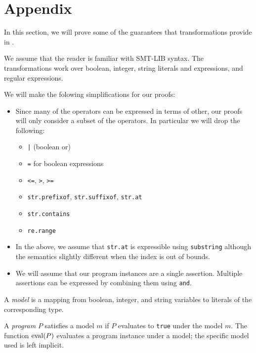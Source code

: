 \section{Appendix}

In this section, we will prove some of the guarantees that transformations
provide in \fuzzer{}.

We assume that the reader is familiar with SMT-LIB syntax. The transformations
work over boolean, integer, string literals and expressions, and regular
expressions.

We will make the folowing simplifications for our proofs:
\begin{itemize}
  \item
    Since many of the operators can be expressed in terms of other, our
    proofs will only consider a subset of the operators. In particular we will
    drop the following:
    \begin{itemize}
      \item \texttt{|} (boolean or)
      \item \texttt{=} for boolean expressions
      \item \texttt{<=}, \texttt{>}, \texttt{>=}
      \item \texttt{str.prefixof}, \texttt{str.suffixof}, \texttt{str.at}
      \item \texttt{str.contains}
      \item \texttt{re.range}
    \end{itemize}

  \item
    In the above, we assume that \texttt{str.at} is expressible using
    \texttt{substring} although the semantics slightly different when the index
    is out of bounds.

  \item
    We will assume that our program instances are a single assertion. Multiple
    assertions can be expressed by combining them using \texttt{and}.
\end{itemize}

\begin{definition}
  A \emph{model} is a mapping from boolean, integer, and string variables to
literals of the corresponding type.
\end{definition}

\begin{definition}
  A \emph{program} $P$ satisfies a model $m$ if $P$ evaluates to \texttt{true}
under the model $m$. The function $\operatorname{eval} (P)$ evaluates a program instance
under a model; the specific model used is left implicit.
\end{definition}

